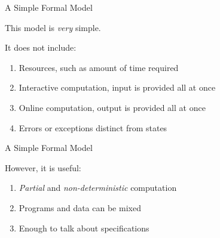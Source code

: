 \documentclass[xetex,aspectratio=169,14pt,hyperref={pdfpagelabels=true,pdflang={en-GB}}]{beamer}
\begin{document}





\begin{frame}
  {A Simple Formal Model}

  This model is \emph{very} simple.

  \bigskip

  It does not include:
  \begin{enumerate}
  \item Resources, such as amount of time required
  \item Interactive computation, input is provided all at once
  \item Online computation, output is provided all at once
  \item Errors or exceptions distinct from states
  \end{enumerate}
\end{frame}

\begin{frame}
  {A Simple Formal Model}

  However, it is useful:

  \bigskip

  \begin{enumerate}
  \item \emph{Partial} and \emph{non-deterministic} computation
  \item Programs and data can be mixed
  \item Enough to talk about specifications
  \end{enumerate}
\end{frame}
\end{document}
